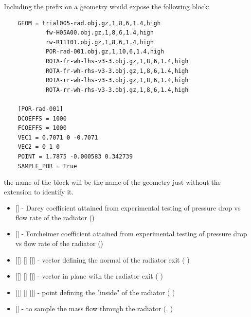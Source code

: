 Including the prefix  on a geometry would expose the following block:
\begin{lstlisting}
    GEOM = trial005-rad.obj.gz,1,8,6,1.4,high
            fw-H05A00.obj.gz,1,8,6,1.4,high
            rw-R11I01.obj.gz,1,8,6,1.4,high
            POR-rad-001.obj.gz,1,10,6,1.4,high
            ROTA-fr-wh-lhs-v3-3.obj.gz,1,8,6,1.4,high
            ROTA-fr-wh-rhs-v3-3.obj.gz,1,8,6,1.4,high
            ROTA-rr-wh-lhs-v3-3.obj.gz,1,8,6,1.4,high
            ROTA-rr-wh-rhs-v3-3.obj.gz,1,8,6,1.4,high

    [POR-rad-001]
    DCOEFFS = 1000
    FCOEFFS = 1000
    VEC1 = 0.7071 0 -0.7071
    VEC2 = 0 1 0
    POINT = 1.7875 -0.000583 0.342739
    SAMPLE_POR = True
\end{lstlisting}
the name of the block will be the name of the geometry just without the extension to identify it.
\begin{itemize}
    \item {} [] - Darcy coefficient attained from experimental testing of pressure drop vs flow rate of the radiator ()
    
    \item {} [] - Forcheimer coefficient attained from experimental testing of pressure drop vs flow rate of the radiator ()
    
    \item {} [[] [] []] - vector defining the normal of the radiator exit (  )
    
    \item {} [[] [] []] - vector in plane with the radiator exit  (  )
    
    \item {} [[] [] []] - point defining the "inside" of the radiator (  )
    
    \item {} [] - to sample the mass flow through the radiator (, )
    

\end{itemize} 

